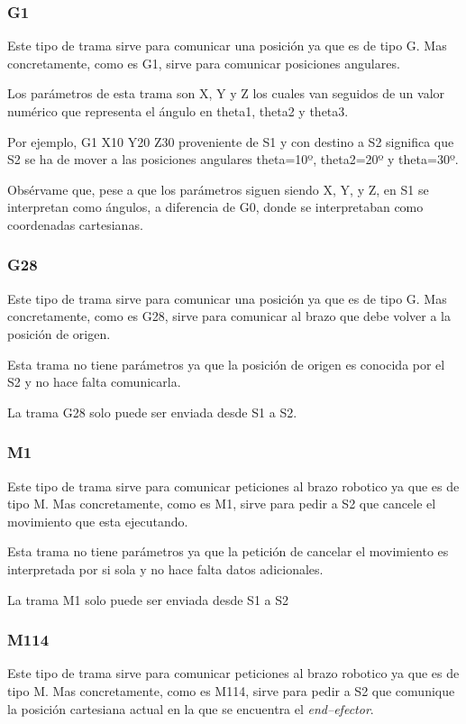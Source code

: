\subsubsection{G1}
Este tipo de trama sirve para comunicar una posición ya que es de tipo G. Mas concretamente, como es G1, sirve para comunicar posiciones angulares.

Los parámetros de esta trama son X, Y y Z los cuales van seguidos de un valor numérico que representa el ángulo en theta1, theta2 y theta3.

Por ejemplo, G1 X10 Y20 Z30 proveniente de \ac{S1} y con destino a \ac{S2} significa que \ac{S2} se ha de mover a las posiciones angulares theta=10º, theta2=20º y theta=30º.

Obsérvame que, pese a que los parámetros siguen siendo X, Y, y Z, en S1 se interpretan como ángulos, a diferencia de G0, donde se interpretaban como coordenadas cartesianas.

\subsubsection{G28}
Este tipo de trama sirve para comunicar una posición ya que es de tipo G. Mas concretamente, como es G28, sirve para comunicar al brazo que debe volver a la posición de origen.

Esta trama no tiene parámetros ya que la posición de origen es conocida por el \ac{S2} y no hace falta comunicarla.

La trama G28 solo puede ser enviada desde \ac{S1} a \ac{S2}.

\subsubsection{M1}
Este tipo de trama sirve para comunicar peticiones al brazo robotico ya que es de tipo M. Mas concretamente, como es M1, sirve para pedir a \ac{S2} que cancele el movimiento que esta ejecutando.

Esta trama no tiene parámetros ya que la petición de cancelar el movimiento es interpretada por si sola y no hace falta datos adicionales.

La trama M1 solo puede ser enviada desde \ac{S1} a \ac{S2}

\subsubsection{M114}
Este tipo de trama sirve para comunicar peticiones al brazo robotico ya que es de tipo M. Mas concretamente, como es M114,
sirve para pedir a \ac{S2} que comunique la posición cartesiana actual en la que se encuentra el \textit{end--efector}.

